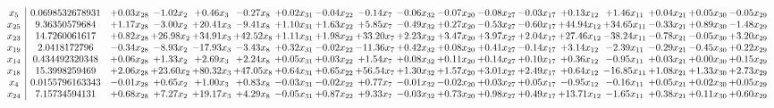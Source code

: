 \documentclass[9pt]{article}
\begin{document}
\[\begin{array}{c| c c@{\hskip 2pt} c@{\hskip 2pt} c@{\hskip 2pt} c@{\hskip 2pt} c@{\hskip 2pt} c@{\hskip 2pt} c@{\hskip 2pt} c@{\hskip 2pt} c@{\hskip 2pt} c@{\hskip 2pt} c@{\hskip 2pt} c@{\hskip 2pt} c@{\hskip 2pt} c@{\hskip 2pt} c@{\hskip 2pt} c@{\hskip 2pt} }
 x_{5}   &  0.0698532678931 & +  0.03 x_{28} & -1.02 x_{2} & +  0.46 x_{3} & -0.27 x_{8} & +  0.02 x_{31} & -0.04 x_{22} & -0.14 x_{7} & -0.06 x_{32} & -0.07 x_{20} & -0.08 x_{27} & -0.03 x_{17} & +  0.13 x_{12} & +  1.46 x_{11} & +  0.04 x_{21} & +  0.05 x_{30} & -0.05 x_{29}\\
 x_{25}   &  9.36350579684 & +  1.17 x_{28} & -3.00 x_{2} & + 20.41 x_{3} & -9.41 x_{8} & +  1.10 x_{31} & +  1.63 x_{22} & +  5.85 x_{7} & -0.49 x_{32} & +  0.27 x_{20} & -0.53 x_{27} & -0.60 x_{17} & + 44.94 x_{12} & + 34.65 x_{11} & -0.33 x_{21} & +  0.89 x_{30} & -1.48 x_{29}\\
 x_{23}   &  14.7260061617 & +  0.82 x_{28} & + 26.98 x_{2} & + 34.91 x_{3} & + 42.52 x_{8} & +  1.11 x_{31} & +  1.98 x_{22} & + 33.20 x_{7} & +  2.23 x_{32} & +  3.47 x_{20} & +  3.97 x_{27} & +  2.04 x_{17} & + 27.46 x_{12} & -38.24 x_{11} & -0.78 x_{21} & -0.05 x_{30} & +  3.20 x_{29}\\
 x_{19}   &  2.0418172796 & -0.34 x_{28} & -8.93 x_{2} & -17.93 x_{3} & -3.43 x_{8} & +  0.32 x_{31} & -0.02 x_{22} & -11.36 x_{7} & +  0.42 x_{32} & +  0.08 x_{20} & +  0.41 x_{27} & -0.14 x_{17} & +  3.14 x_{12} & -2.39 x_{11} & -0.29 x_{21} & -0.45 x_{30} & +  0.22 x_{29}\\
 x_{14}   &  0.434492320348 & +  0.06 x_{28} & +  1.33 x_{2} & +  2.69 x_{3} & +  2.24 x_{8} & +  0.05 x_{31} & +  0.03 x_{22} & +  1.54 x_{7} & +  0.08 x_{32} & +  0.11 x_{20} & +  0.14 x_{27} & +  0.10 x_{17} & +  0.36 x_{12} & -0.95 x_{11} & +  0.03 x_{21} & +  0.00 x_{30} & +  0.15 x_{29}\\
 x_{18}   &  15.3998259469 & +  2.06 x_{28} & + 23.60 x_{2} & + 80.32 x_{3} & + 47.05 x_{8} & +  0.64 x_{31} & +  0.65 x_{22} & + 56.54 x_{7} & +  1.30 x_{32} & +  1.57 x_{20} & +  3.01 x_{27} & +  2.49 x_{17} & +  0.64 x_{12} & -16.85 x_{11} & +  1.08 x_{21} & +  1.33 x_{30} & +  2.73 x_{29}\\
 x_{4}   &  0.0155796163343 & -0.01 x_{28} & +  0.65 x_{2} & +  1.00 x_{3} & +  0.83 x_{8} & -0.03 x_{31} & -0.02 x_{22} & +  0.77 x_{7} & -0.01 x_{32} & -0.02 x_{20} & +  0.03 x_{27} & +  0.05 x_{17} & -0.95 x_{12} & -0.16 x_{11} & +  0.05 x_{21} & +  0.02 x_{30} & +  0.05 x_{29}\\
 x_{24}   &  7.15734594131 & +  0.68 x_{28} & +  7.27 x_{2} & + 19.17 x_{3} & +  4.29 x_{8} & -0.05 x_{31} & +  0.87 x_{22} & +  9.33 x_{7} & -0.03 x_{32} & +  0.73 x_{20} & +  0.98 x_{27} & +  0.49 x_{17} & + 13.71 x_{12} & -1.65 x_{11} & +  0.38 x_{21} & +  0.11 x_{30} & +  0.60 x_{29}\\

\end{array}\]
\end{document}
